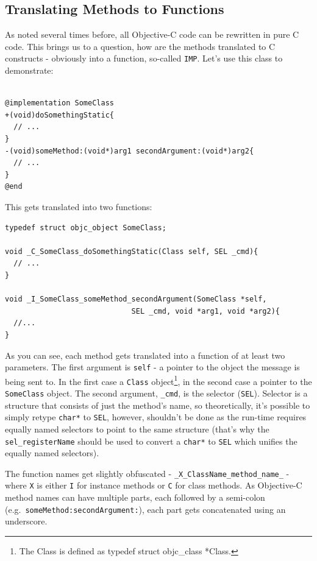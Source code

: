 \documentclass[a4paper, 11pt, fleqn]{book}
\begin{document}
\subsection{Translating Methods to Functions}

As noted several times before, all Objective-C code can be rewritten in pure C code. This brings us to a question, how are the methods translated to C constructs - obviously into a function, so-called \verb=IMP=. Let's use this class to demonstrate:

\begin{verbatim}

@implementation SomeClass
+(void)doSomethingStatic{
  // ...
}
-(void)someMethod:(void*)arg1 secondArgument:(void*)arg2{
  // ...
}
@end

\end{verbatim}

This gets translated into two functions:

\begin{verbatim}
typedef struct objc_object SomeClass;

void _C_SomeClass_doSomethingStatic(Class self, SEL _cmd){
  // ...
}

void _I_SomeClass_someMethod_secondArgument(SomeClass *self,
                             SEL _cmd, void *arg1, void *arg2){
  //...
}
\end{verbatim}

As you can see, each method gets translated into a function of at least two parameters. The first argument is \verb=self= - a pointer to the object the message is being sent to. In the first case a \verb=Class= object\footnote{The Class is defined as typedef struct objc\_class *Class.}, in the second case a pointer to the \verb=SomeClass= object. The second argument, \verb=_cmd=, is the selector (\verb=SEL=). Selector is a structure that consists of just the method's name, so theoretically, it's possible to simply retype \verb=char*= to \verb=SEL=, however, shouldn't be done as the run-time requires equally named selectors to point to the same structure (that's why the \verb=sel_registerName= should be used to convert a \verb=char*= to \verb=SEL= which unifies the equally named selectors).

The function names get slightly obfuscated - \verb=_X_ClassName_method_name_= - where \verb=X= is either \verb=I= for instance methods or \verb=C= for class methods. As Objective-C method names can have multiple parts, each followed by a semi-colon (e.g.\ \verb=someMethod:secondArgument:=), each part gets concatenated using an underscore.
\end{document}
